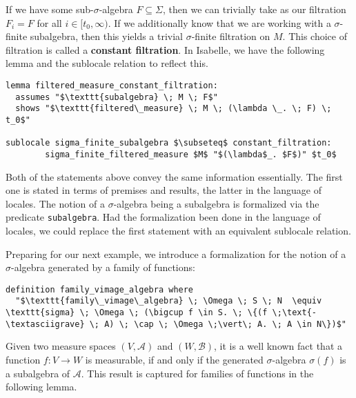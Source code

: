 If we have some sub-$\sigma$-algebra $F \subseteq \Sigma$, then we can trivially take as our filtration $F_i = F$ for all $i \in [t_0,\infty)$. If we additionally know that we are working with a $\sigma$-finite subalgebra, then this yields a trivial $\sigma$-finite filtration on $M$. This choice of filtration is called a \textbf{constant filtration}. In Isabelle, we have the following lemma and the sublocale relation to reflect this.

\begin{isalemma}
{\small
\begin{lstlisting}[style=isabelle]
lemma filtered_measure_constant_filtration:
  assumes "$\texttt{subalgebra} \; M \; F$"
  shows "$\texttt{filtered\_measure} \; M \; (\lambda \_. \; F) \; t_0$"

sublocale sigma_finite_subalgebra $\subseteq$ constant_filtration: 
		sigma_finite_filtered_measure $M$ "$(\lambda$_. $F$)" $t_0$
\end{lstlisting}
}
\end{isalemma}

\begin{remark}
	Both of the statements above convey the same information essentially. The first one is stated in terms of premises and results, the latter in the language of locales. The notion of a $\sigma$-algebra being a subalgebra is formalized via the predicate \texttt{subalgebra}. Had the formalization been done in the language of locales, we could replace the first statement with an equivalent sublocale relation.
\end{remark}

Preparing for our next example, we introduce a formalization for the notion of a $\sigma$-algebra generated by a family of functions:

\begin{isadefinition}
{\small
\begin{lstlisting}[style=isabelle]
definition family_vimage_algebra where
  "$\texttt{family\_vimage\_algebra} \; \Omega \; S \; N  \equiv \texttt{sigma} \; \Omega \; (\bigcup f \in S. \; \{(f \;\text{-\textasciigrave} \; A) \; \cap \; \Omega \;\vert\; A. \; A \in N\})$"
\end{lstlisting}
}
\end{isadefinition}

Given two measure spaces $(V, \mathcal{A})$ and $(W, \mathcal{B})$, it is a well known fact that a function $f : V \rightarrow W$ is measurable, if and only if the generated $\sigma$-algebra $\sigma(f)$ is a subalgebra of $\mathcal{A}$. This result is captured for families of functions in the following lemma.

